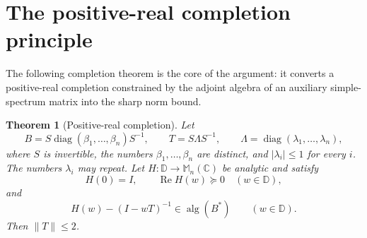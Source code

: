 \documentclass[preprints,article,submit,oneauthor]{Definitions/mdpi}
\newcounter{manuscriptresult}[section]
\theoremstyle{mdpi}
\newtheorem{theorem}[manuscriptresult]{Theorem}
\theoremstyle{definition}
\newcommand{\C}{\mathbb C}
\newcommand{\D}{\mathbb D}
\newcommand{\Mn}{\mathbb M_n(\C)}
\newcommand{\alg}{\operatorname{alg}}
\newcommand{\RePart}{\operatorname{Re}}
\newcommand{\diag}{\operatorname{diag}}
\begin{document}
\section{The positive-real completion principle}
\label{sec:completion}

The following completion theorem is the core of the argument: it
converts a positive-real completion constrained by the adjoint algebra
of an auxiliary simple-spectrum matrix into the sharp norm bound.

\begin{theorem}[Positive-real completion]
\label{thm:completion}
Let
\begin{equation}
  B=S\diag(\beta_1,\ldots,\beta_n)S^{-1},
  \qquad
  T=S\Lambda S^{-1},
  \qquad
  \Lambda=\diag(\lambda_1,\ldots,\lambda_n),
  \label{eq:T-diagonalization}
\end{equation}
where $S$ is invertible, the numbers $\beta_1,\ldots,\beta_n$ are
distinct, and $\lvert\lambda_i\rvert\leq1$ for every $i$.  The numbers
$\lambda_i$ may repeat.
Let $H\colon\D\to\Mn$ be analytic and satisfy
\begin{equation}
  H(0)=I,\qquad \RePart H(w)\succeq0\quad(w\in\D),
  \label{eq:completion-positive-real}
\end{equation}
and
\begin{equation}
  H(w)-(I-wT)^{-1}\in\alg(B^*)\qquad(w\in\D).
  \label{eq:completion-algebra-condition}
\end{equation}
Then $\lVert T\rVert\leq2$.
\end{theorem}
\end{document}
